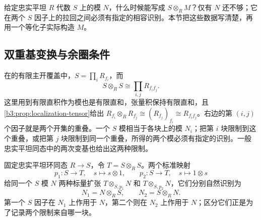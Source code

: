 

给定忠实平坦 \(R\) 代数 \(S\) 上的模 \(N\)，什么时候能写成 \(S\otimes_RM\)？仅有 \(N\) 还不够；它在两个 \(S\) 因子上的拉回之间必须有指定的相容识别。本节把这些数据写清楚，再用一个等化子实际构造 \(M\)。


\subsection{双重基变换与余圈条件}
\label{b3:subsec:1206:01}

在的有限主开覆盖中，\(S=\prod_iR_{f_i}\)，而
\[
	S\otimes_RS\cong\prod_{i,j}R_{f_if_j}.
\]
这里用到有限直积作为模也是有限直和，张量积保持有限直和，且\cref{b3:prop:localization-tensor}给出 \(R_{f_i}\otimes_RR_{f_j}\cong(R_{f_j})_{f_i}\cong R_{f_if_j}\)。右边的第 \((i,j)\) 个因子就是两个开集的重叠。一个 \(S\) 模相当于各块上的模 \(N_i\)；把第 \(i\) 块限制到这个重叠，或把第 \(j\) 块限制到同一个重叠，所得的两个模必须有指定的识别。一般忠实平坦同态中的两次变基也给出这两种限制。

固定忠实平坦环同态 \(R\to S\)，令 \(T=S\otimes_RS\)。两个标准映射
\[
	p_1:S\to T,\quad s\mapsto s\otimes1, \qquad p_2:S\to T,\quad s\mapsto1\otimes s
\]
给同一个 \(S\) 模 \(N\) 两种标量扩张 \(T\otimes_{S,p_1}N\) 和 \(T\otimes_{S,p_2}N\)，它们分别自然识别为
\[
	N_1=N\otimes_RS,\qquad N_2=S\otimes_RN.
\]
第一个 \(S\) 因子在 \(N_1\) 上作用于 \(N\)，第二个则在 \(N_2\) 上作用于 \(N\)；区分它们正是为了记录两个限制来自哪一块。

